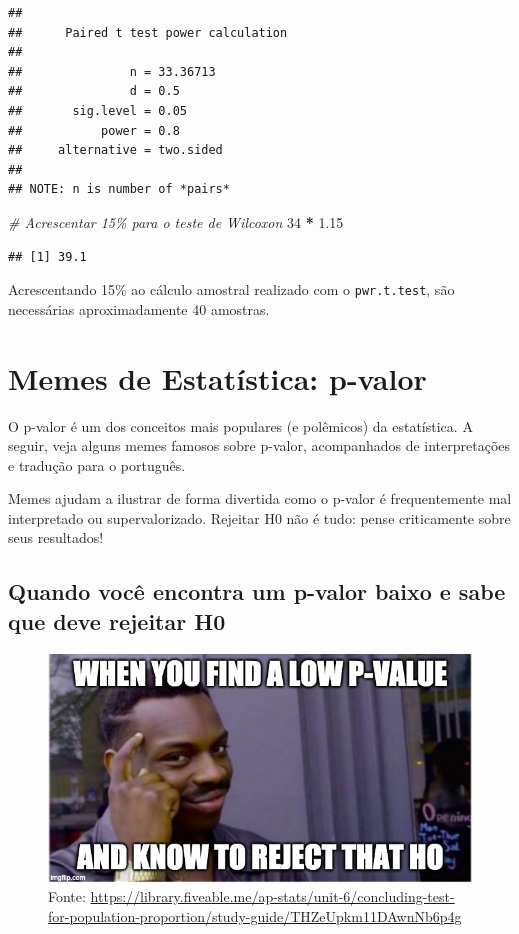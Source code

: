 \documentclass[
]{book}
\newenvironment{Shaded}{\begin{snugshade}}{\end{snugshade}}
\newcommand{\CommentTok}[1]{\textcolor[rgb]{0.56,0.35,0.01}{\textit{#1}}}
\newcommand{\DecValTok}[1]{\textcolor[rgb]{0.00,0.00,0.81}{#1}}
\newcommand{\FloatTok}[1]{\textcolor[rgb]{0.00,0.00,0.81}{#1}}
\newcommand{\SpecialCharTok}[1]{\textcolor[rgb]{0.81,0.36,0.00}{\textbf{#1}}}
\begin{document}
\begin{verbatim}
## 
##      Paired t test power calculation 
## 
##               n = 33.36713
##               d = 0.5
##       sig.level = 0.05
##           power = 0.8
##     alternative = two.sided
## 
## NOTE: n is number of *pairs*
\end{verbatim}

\begin{Shaded}
\begin{Highlighting}[]
\CommentTok{\# Acrescentar 15\% para o teste de Wilcoxon}
\DecValTok{34} \SpecialCharTok{*} \FloatTok{1.15}
\end{Highlighting}
\end{Shaded}

\begin{verbatim}
## [1] 39.1
\end{verbatim}

Acrescentando 15\% ao cálculo amostral realizado com o \texttt{pwr.t.test}, são necessárias aproximadamente 40 amostras.

\chapter{Memes de Estatística: p-valor}\label{memes-de-estatuxedstica-p-valor}

O p-valor é um dos conceitos mais populares (e polêmicos) da estatística. A seguir, veja alguns memes famosos sobre p-valor, acompanhados de interpretações e tradução para o português.

Memes ajudam a ilustrar de forma divertida como o p-valor é frequentemente mal interpretado ou supervalorizado. Rejeitar H0 não é tudo: pense criticamente sobre seus resultados!

\section{Quando você encontra um p-valor baixo e sabe que deve rejeitar H0}\label{quando-vocuxea-encontra-um-p-valor-baixo-e-sabe-que-deve-rejeitar-h0}

\begin{figure}
\centering
\includegraphics{p-value4.jpg}
\caption{Fonte: \url{https://library.fiveable.me/ap-stats/unit-6/concluding-test-for-population-proportion/study-guide/THZeUpkm11DAwnNb6p4g}}
\end{figure}
\end{document}
